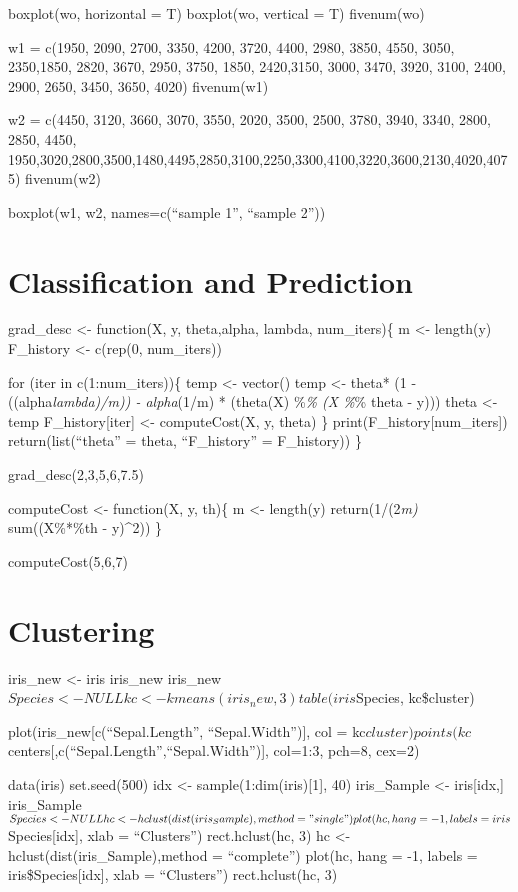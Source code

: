 \documentclass[
]{article}
\begin{document}
boxplot(wo, horizontal = T) boxplot(wo, vertical = T) fivenum(wo)

w1 = c(1950, 2090, 2700, 3350, 4200, 3720, 4400, 2980, 3850, 4550, 3050,
2350,1850, 2820, 3670, 2950, 3750, 1850, 2420,3150, 3000, 3470, 3920,
3100, 2400, 2900, 2650, 3450, 3650, 4020) fivenum(w1)

w2 = c(4450, 3120, 3660, 3070, 3550, 2020, 3500, 2500, 3780, 3940, 3340,
2800, 2850, 4450,
1950,3020,2800,3500,1480,4495,2850,3100,2250,3300,4100,3220,3600,2130,4020,4075)
fivenum(w2)

boxplot(w1, w2, names=c(``sample 1'', ``sample 2''))

\section{Classification and
Prediction}\label{classification-and-prediction}

grad\_desc \textless- function(X, y, theta,alpha, lambda, num\_iters)\{
m \textless- length(y) F\_history \textless- c(rep(0, num\_iters))

for (iter in c(1:num\_iters))\{ temp \textless- vector() temp \textless-
theta* (1 - ((alpha\emph{lambda)/m)) - alpha}(1/m) * (theta(X)
\%\emph{\% (X \%}\% theta - y))) theta \textless- temp
F\_history{[}iter{]} \textless- computeCost(X, y, theta) \}
print(F\_history{[}num\_iters{]}) return(list(``theta'' = theta,
``F\_history'' = F\_history)) \}

grad\_desc(2,3,5,6,7.5)

computeCost \textless- function(X, y, th)\{ m \textless- length(y)
return(1/(2\emph{m) } sum((X\%*\%th - y)\^{}2)) \}

computeCost(5,6,7)

\section{Clustering}\label{clustering}

iris\_new \textless- iris iris\_new iris\_new\(Species <- NULL
kc <- kmeans(iris_new, 3)
table(iris\)Species, kc\$cluster)

plot(iris\_new{[}c(``Sepal.Length'', ``Sepal.Width''){]}, col =
kc\(cluster)
points(kc\)centers{[},c(``Sepal.Length'',``Sepal.Width''){]}, col=1:3,
pch=8, cex=2)

data(iris) set.seed(500) idx \textless- sample(1:dim(iris){[}1{]}, 40)
iris\_Sample \textless- iris{[}idx,{]} iris\_Sample\(Species <- NULL
hc <- hclust(dist(iris_Sample), method = "single")
plot(hc, hang = -1, labels = iris\)Species{[}idx{]}, xlab =
``Clusters'') rect.hclust(hc, 3) hc \textless-
hclust(dist(iris\_Sample),method = ``complete'') plot(hc, hang = -1,
labels = iris\$Species{[}idx{]}, xlab = ``Clusters'') rect.hclust(hc, 3)
\end{document}
